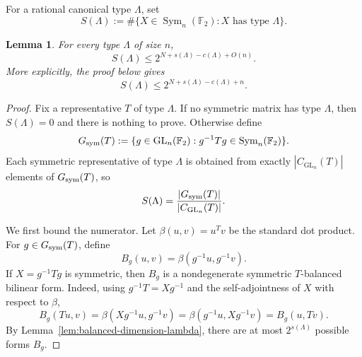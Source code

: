 \documentclass[11pt]{amsart}
\newtheorem{lemma}[theorem]{Lemma}
\theoremstyle{remark}
\numberwithin{equation}{section}
\newcommand{\F}{\mathbb F}
\newcommand{\Sym}{\operatorname{Sym}}
\newcommand{\GL}{\operatorname{GL}}
\begin{document}
For a rational canonical type $\Lambda$, set
\[
        S(\Lambda):=\#\{X\in\Sym_n(\F_2):X\text{ has type }\Lambda\}.
\]

\begin{lemma}\label{lem:symmetric-type-bound}
For every type $\Lambda$ of size $n$,
\[
        S(\Lambda)\leq 2^{N+s(\Lambda)-c(\Lambda)+O(n)}.
\]
More explicitly, the proof below gives
\[
        S(\Lambda)\leq 2^{N+s(\Lambda)-c(\Lambda)+n}.
\]
\end{lemma}

\begin{proof}
Fix a representative $T$ of type $\Lambda$.  If no symmetric matrix has type $\Lambda$, then $S(\Lambda)=0$ and there is nothing to prove.  Otherwise define
\[
        G_{\rm sym}(T):=\{g\in\GL_n(\F_2):g^{-1}Tg\in\Sym_n(\F_2)\}.
\]
Each symmetric representative of type $\Lambda$ is obtained from exactly $|C_{\GL_n}(T)|$ elements of $G_{\rm sym}(T)$, so
\begin{equation}\label{eq:S-lambda-quotient}
        S(\Lambda)=\frac{|G_{\rm sym}(T)|}{|C_{\GL_n}(T)|}.
\end{equation}

We first bound the numerator.  Let $\beta(u,v)=u^Tv$ be the standard dot product.  For $g\in G_{\rm sym}(T)$, define
\[
        B_g(u,v)=\beta(g^{-1}u,g^{-1}v).
\]
If $X=g^{-1}Tg$ is symmetric, then $B_g$ is a nondegenerate symmetric $T$-balanced bilinear form.  Indeed, using $g^{-1}T=Xg^{-1}$ and the self-adjointness of $X$ with respect to $\beta$,
\[
        B_g(Tu,v)=\beta(Xg^{-1}u,g^{-1}v)
        =\beta(g^{-1}u,Xg^{-1}v)=B_g(u,Tv).
\]
By Lemma~\ref{lem:balanced-dimension-lambda}, there are at most $2^{s(\Lambda)}$ possible forms $B_g$.


\end{proof}
\end{document}
